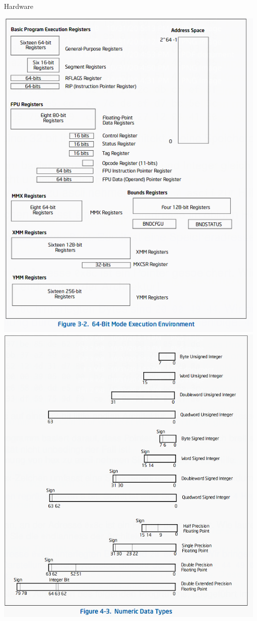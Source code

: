 \documentclass[10pt]{beamer}
\begin{document}
\begin{frame}[allowframebreaks]{Hardware}
\begin{center}
    \includegraphics[keepaspectratio, width=\textwidth, height=\textheight-2\baselineskip-2\baselineskip]{img/001_registers.png} \\ \framebreak
    \includegraphics[keepaspectratio, width=\textwidth, height=\textheight-2\baselineskip-2\baselineskip]{img/001_data_types.png} \\

\end{center}
\end{frame}
\end{document}
